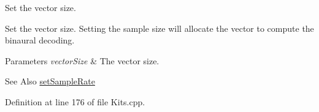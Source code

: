 Set the vector size. 

Set the vector size. Setting the sample size will allocate the vector to compute the binaural decoding.


\begin{DoxyParams}{Parameters}
{\em vector\-Size} & The vector size.\\
\hline
\end{DoxyParams}
\begin{DoxySeeAlso}{See Also}
\hyperlink{class_hoa2_d_1_1_kit_sources_a8ae713ecbf98a183b49f0e796622d7a7}{set\-Sample\-Rate} 
\end{DoxySeeAlso}


Definition at line 176 of file Kits.\-cpp.

